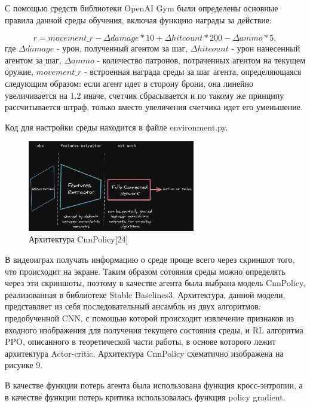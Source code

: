 \documentclass[bachelor, och, coursework]{shiza}
\begin{document}
С помощью средств библиотеки OpenAI Gym были определены основные правила данной среды обучения, включая функцию награды за действие:

\begin{equation}
    r = movement\_r - \Delta damage*10 + \Delta hitcount*200 - \Delta ammo*5,
\end{equation}
где $\Delta damage$ - урон, полученный агентом за шаг, $\Delta hitcount$ - урон нанесенный агентом за шаг, $\Delta ammo$ - количество патронов, потраченных агентом на текущем
оружие, $movement\_r$ - встроенная награда среды за шаг агента, определяющаяся следующим образом: если агент идет в сторону брони, она линейно увеличивается на 1.2 иначе,
счетчик сбрасывается и по такому же принципу рассчитывается штраф, только вместо увеличения счетчика идет его уменьшение.

Код для настройки среды находится в файле environment.py.

\begin{figure}[H]
    \centering
    \includegraphics[width=0.65\textwidth]{pic/10}
    \caption{Архитектура CnnPolicy[24]}
    \label{fig:img1}
\end{figure}

В видеоиграх получать информацию о среде проще всего через скриншот того, что происходит на экране. Таким образом сотояния среды можно определять через эти скриншоты, поэтому 
в качестве агента была выбрана модель CnnPolicy, реализованная в библиотеке Stable Baselines3. Архитектура, данной модели, представляет из себя последовательный ансамбль
из двух алгоритмов: предобученной CNN, с помощью которой происходит извлечение признаков из входного изображения для получения текущего состояния среды, и RL алгоритма PPO, описанного
в теоретической части работы, в основе которого лежит архитектура Actor-critic. Архитектура CnnPolicy схематично изображена на рисунке 9.

В качестве функции потерь агента была использована функция кросс-энтропии, а в качестве функции потерь критика использовалась функция policy gradient.
\end{document}
